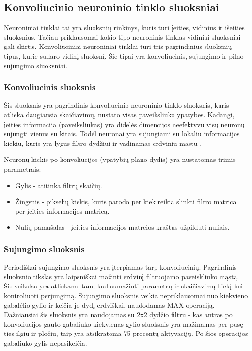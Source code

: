 \documentclass{VUMIFPSkursinis}
\begin{document}
\subsection{Konvoliucinio neuroninio tinklo sluoksniai}
Neuroniniai tinklai tai yra sluoksnių rinkinys, kuris turi įeities, vidinius ir išeities sluoksnius. Tačiau priklausomai 
kokio tipo neuroninis tinklas vidiniai sluoksniai gali skirtis. Konvoliuciniai neuroniniai tinklai turi tris pagrindinius 
sluoksnių tipus, kurie sudaro vidinį sluoksnį. Šie tipai yra konvoliucinis, sujungimo ir pilno sujungimo sluoksniai.

\subsubsection{Konvoliucinis sluoksnis}
Šis sluoksnis yra pagrindinis konvoliucinio neuroninio tinklo sluoksnis, kuris atlieka daugiausia skaičiavimų, nustato visas paveiksliuko ypatybes.
Kadangi, įeities informacija (paveiksliukas) yra didelės dimencijos neefektyvu visų neuronų sujungti vienus su kitais. Todėl neuronai yra sujungiami
su lokaliu informacijos kiekiu, kuris yra lygus filtro dydžiui ir vadinamas erdviniu mastu \cite{layers-CS231n}.

Neuronų kiekis po konvoliucijos (ypatybių plano dydis) yra nustatomas trimis parametrais:
\begin{itemize}
\item Gylis - atitinka filtrų skaičių.
\item Žingsnis - pikselių kiekis, kuris parodo per kiek reikia slinkti filtro matrica per įeities informacijos matricą.
\item Nulių pamušalas - įeities informacijos matrcios kraštus užpilduti nuliais.
\end{itemize}

\subsubsection{Sujungimo sluoksnis}
Periodiškai sujungimo sluoksnis yra įterpiamas tarp konvoliucinių. Pagrindinis sluoksnio tikslas yra laipsniškai mažinti erdvinį filtruojamo paveiskliuko mąstą.
Šis veikslas yra atliekams tam, kad sumažinti parametrų ir skaičiavimų kiekį bei kontroliuoti perjungimą. Sujungimo sluoksnis veikia nepriklausomai nuo kiekvieno
gabalėlio gylio ir keičia jo dydį erdviškai, naudodamas MAX operaciją. Dažniausiai šis sluoksnis yra naudojamas su 2x2 dydžio filtru - kas antras po konvoliucijos 
gauto gabaliuko kiekvienas gylio sluoksnis yra mažinamas per pusę ties ilgiu ir pločiu, taip yra atsikratoma 75 procentų aktyvacijų. Po šios operacijos gabaliuko 
gylis nepasikeičia.
\end{document}
